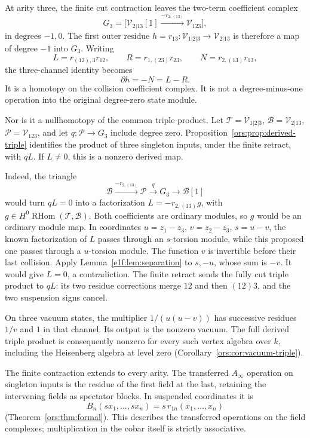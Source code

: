 At arity three, the finite cut contraction leaves the
two-term coefficient complex
\begin{equation}\label{e1f:eq:residue-ternary}
 G_3=\bigl[\mathcal V_{2|13}[1]
             \xrightarrow{-r_{2,(13)}}\mathcal V_{123}\bigr],
\end{equation}
in degrees \(-1,0\). The first outer residue
\(h=r_{13}:\mathcal V_{1|2|3}\to\mathcal V_{2|13}\)
is therefore a map of degree \(-1\) into \(G_3\).
Writing\label{e1f:def:residue-composite-channels}
\[
 L=r_{(12),3}r_{12},\qquad
 R=r_{1,(23)}r_{23},\qquad
 N=r_{2,(13)}r_{13},
\]
the three-channel identity becomes
\[
 \partial h=-N=L-R.
\]
It is a homotopy on the collision coefficient complex.
It is not a degree-minus-one operation into the original
degree-zero state module.

Nor is it a nullhomotopy of the common triple product.
Let \(\mathcal T=\mathcal V_{1|2|3}\),
\(\mathcal B=\mathcal V_{2|13}\),
\(\mathcal P=\mathcal V_{123}\), and let
\(q:\mathcal P\to G_3\) include degree zero.
Proposition~\ref{ors:prop:derived-triple} identifies the
product of three singleton inputs, under the finite
retract, with \(qL\). If \(L\ne0\), this is a nonzero
derived map.

Indeed, the triangle
\[
 \mathcal B\xrightarrow{-r_{2,(13)}}\mathcal P
       \xrightarrow{q}G_3\longrightarrow\mathcal B[1]
\]
would turn \(qL=0\) into a factorization
\(L=-r_{2,(13)}g\), with
\(g\in H^0\operatorname{RHom}(\mathcal T,\mathcal B)\).
Both coefficients are ordinary modules, so \(g\) would be
an ordinary module map. In coordinates
\(u=z_1-z_3\), \(v=z_2-z_3\), \(s=u-v\), the known
factorization of \(L\) passes through an \(s\)-torsion
module, while this proposed one passes through a
\(u\)-torsion module. The function \(v\) is invertible
before their last collision. Apply
Lemma~\ref{e1f:lem:separation} to \(s,-u\), whose sum
is \(-v\). It would give \(L=0\), a contradiction.
The finite retract sends the fully cut triple product
to \(qL\): its two residue corrections merge \(12\)
and then \((12)3\), and the two suspension signs cancel.

On three vacuum states, the multiplier \(1/(u(u-v))\)
has successive residues \(1/v\) and \(1\) in that
channel. Its output is the nonzero vacuum. The full
derived triple product is consequently nonzero for every
such vertex algebra over \(k\), including the Heisenberg
algebra at level zero
(Corollary~\ref{ors:cor:vacuum-triple}).

The finite contraction extends to every arity. The transferred
\(A_\infty\) operation on singleton inputs is the residue
of the first field at the last, retaining the intervening
fields as spectator blocks. In suspended coordinates it is
\[
 B_n(sx_1,\ldots,sx_n)=s\,r_{1n}(x_1,\ldots,x_n)
\]
(Theorem~\ref{ors:thm:formal}). This describes the
transferred operations on the field complexes; multiplication
in the cobar itself is strictly associative.

